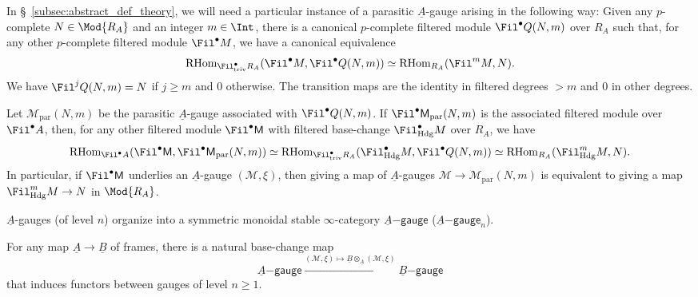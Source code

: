\documentclass[10pt]{amsart}
\begin{document}
\begin{example}
 \label{ex:parasitic_gauges}
In \S~\ref{subsec:abstract_def_theory}, we will need a particular instance of a parasitic $\underline{A}$-gauge arising in the following way: Given any $p$-complete $N\in \Mod{R_A}$ and an integer $m\in \Int$, there is a canonical $p$-complete filtered module $\Fil^\bullet Q(N,m)$ over $R_A$ such that, for any other $p$-complete filtered module $\Fil^\bullet M$, we have a canonical equivalence
\[
\mathrm{RHom}_{\Fil^\bullet_{\mathrm{triv}}R_A}(\Fil^\bullet M,\Fil^\bullet Q(N,m))\simeq \mathrm{RHom}_{R_A}(\Fil^m M,N).
\]
We have $\Fil^jQ(N,m) = N$ if $j\ge m$ and $0$ otherwise. The transition maps are the identity in filtered degrees $>m$ and $0$ in other degrees. 

Let $\mathcal{M}_{\mathrm{par}}(N,m)$ be the parasitic $\underline{A}$-gauge associated with $\Fil^\bullet Q(N,m)$. If $\Fil^\bullet \mathsf{M}_{\mathrm{par}}(N,m)$ is the associated filtered module over $\Fil^\bullet A$, then, for any other filtered module $\Fil^\bullet \mathsf{M}$ with filtered base-change $\Fil^\bullet_{\mathrm{Hdg}}M$ over $R_A$, we have
\[
\mathrm{RHom}_{\Fil^\bullet A}(\Fil^\bullet \mathsf{M},\Fil^\bullet \mathsf{M}_{\mathrm{par}}(N,m))\simeq \mathrm{RHom}_{\Fil^\bullet_{\mathrm{triv}}R_A}(\Fil^\bullet_{\mathrm{Hdg}}M,\Fil^\bullet Q(N,m))\simeq \mathrm{RHom}_{R_A}(\Fil^m_{\mathrm{Hdg}}M,N).
\]
In particular, if $\Fil^\bullet \mathsf{M}$ underlies an $\underline{A}$-gauge $(\mathcal{M},\xi)$, then giving a map of $\underline{A}$-gauges $\mathcal{M}\to \mathcal{M}_{\mathrm{par}}(N,m)$ is equivalent to giving a map $\Fil^m_{\mathrm{Hdg}}M\to N$ in $\Mod{R_A}$.
\end{example} 


\begin{remark}
$\underline{A}$-gauges (of level $n$) organize into a symmetric monoidal stable $\infty$-category $\underline{A}\mathsf{-gauge}$ ($\underline{A}\mathsf{-gauge}_n$).

For any map $\underline{A}\to \underline{B}$ of frames, there is a natural base-change map 
\[
\underline{A}\mathsf{-gauge}\xrightarrow{(\mathcal{M},\xi)\mapsto \underline{B}\otimes_{\underline{A}}(\mathcal{M},\xi)}\underline{B}\mathsf{-gauge}
\]
that induces functors between gauges of level $n\ge 1$.
\end{remark}
\end{document}
